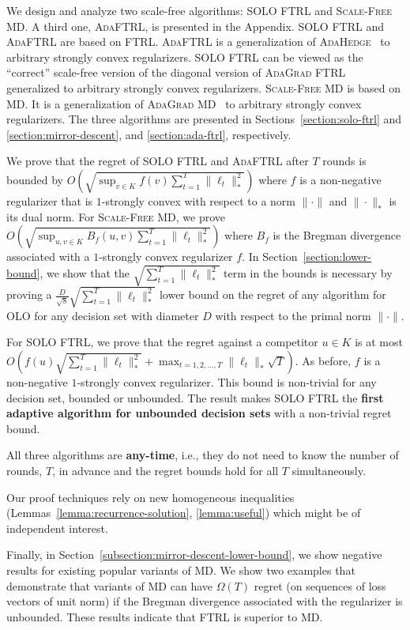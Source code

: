We design and analyze two scale-free algorithms: \textsc{SOLO FTRL} and
\textsc{Scale-Free MD}.  A third one, \textsc{AdaFTRL}, is presented in
the Appendix. \textsc{SOLO FTRL} and \textsc{AdaFTRL} are based on
\textsc{FTRL}.  \textsc{AdaFTRL} is a generalization of
\textsc{AdaHedge}~\cite{de-Rooij-van-Erven-Grunwald-Koolen-2014} to arbitrary
strongly convex regularizers.  \textsc{SOLO FTRL} can be viewed as the
``correct'' scale-free version of the diagonal version of \textsc{AdaGrad
FTRL}~\cite{Duchi-Hazan-Singer-2011} generalized to arbitrary strongly convex
regularizers.  \textsc{Scale-Free MD} is based on \textsc{MD}. It is a
generalization of \textsc{AdaGrad MD}~\cite{Duchi-Hazan-Singer-2011} to
arbitrary strongly convex regularizers.  The three algorithms are presented in
Sections~\ref{section:solo-ftrl} and \ref{section:mirror-descent}, and
\ref{section:ada-ftrl}, respectively.

We prove that the regret of \textsc{SOLO FTRL} and \textsc{AdaFTRL} after $T$
rounds is bounded by $O (\sqrt{\sup_{v \in K} f(v) \sum_{t=1}^T\|\ell_t\|_*^2} )$
where $f$ is a non-negative regularizer that is $1$-strongly convex with respect
to a norm $\|\cdot\|$ and $\|\cdot\|_*$ is its dual norm. For \textsc{Scale-Free
MD}, we prove $O (\sqrt{\sup_{u,v \in K} B_f(u,v) \sum_{t=1}^T\|\ell_t\|_*^2} )$
where $B_f$ is the Bregman divergence associated with a $1$-strongly convex
regularizer $f$. In Section~\ref{section:lower-bound}, we show that the
$\sqrt{\sum_{t=1}^T \|\ell_t\|_*^2}$ term in the bounds is necessary by proving
a $\frac{D}{\sqrt{8}} \sqrt{\sum_{t=1}^T\|\ell_t\|_*^2}$ lower bound on the
regret of any algorithm for OLO for any decision set with diameter $D$ with
respect to the primal norm $\|\cdot\|$.

For \textsc{SOLO FTRL}, we prove that the regret against a competitor $u \in K$
is at most $O (f(u) \sqrt{\sum_{t=1}^T \|\ell_t\|_*^2} + \max_{t=1,2,\dots,T}
\|\ell_t\|_* \sqrt{T} )$.  As before, $f$ is a non-negative $1$-strongly convex
regularizer. This bound is non-trivial for any decision set, bounded or
unbounded.  The result makes \textsc{SOLO FTRL} the \textbf{first adaptive
algorithm for unbounded decision sets} with a non-trivial regret bound.

All three algorithms are \textbf{any-time}, i.e., they do not need to know the
number of rounds, $T$, in advance and the regret bounds hold for all $T$
simultaneously.

Our proof techniques rely on new homogeneous
inequalities (Lemmas~\ref{lemma:recurrence-solution}, \ref{lemma:useful})
which might be of independent interest.

Finally, in Section~\ref{subsection:mirror-descent-lower-bound}, we show
negative results for existing popular variants of \textsc{MD}. We show two
examples that demonstrate that variants of \textsc{MD} can have $\Omega(T)$
regret (on sequences of loss vectors of unit norm) if the Bregman divergence
associated with the regularizer is unbounded. These results indicate that
\textsc{FTRL} is superior to \textsc{MD}.
